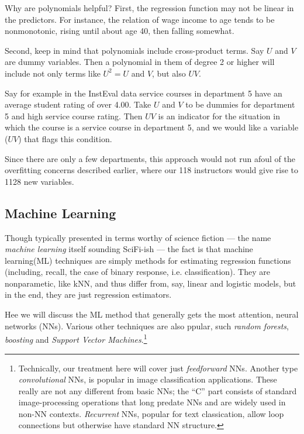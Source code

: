 Why are polynomials helpful?  First, the regression function may not be
linear in the predictors.  For instance, the relation of wage income to
age tends to be nonmonotonic, rising until about age 40, then falling
somewhat.

Second, keep in mind that polynomials include cross-product terms.
Say $U$ and $V$ are dummy variables.  Then a polynomial in them of
degree 2 or higher will include not only terms like $U^2 = U$ and $V$,
but also $UV$.

Say for example in the InstEval data service courses in department 5
have an average student rating of over 4.00.  Take $U$ and $V$ to be
dummies for department 5 and high service course rating.  Then $UV$ is
an indicator for the situation in which the course is a service course
in department 5, and we would like a variable ($UV$) that flags this
condition.

Since there are only a few departments, this approach would not run
afoul of the overfitting concerns described earlier, where our 118
instructors would give rise to 1128 new variables.

\subsection{Machine Learning}

Though typically presented in terms worthy of science fiction --- the
name \textit{machine learning} itself sounding SciFi-ish --- the fact is
that machine learning(ML) techniques are simply methods for estimating
regression functions (including, recall, the case of binary response,
i.e. classification).  They are nonparametic, like kNN, and thus differ
from, say, linear and logistic models, but in the end, they are just
regression estimators.

Hee we will discuss the ML method that generally gets the most
attention, neural networks (NNs).  Various other techniques are also
ppular, such \textit{random forests}, \textit{boosting} and
\textit{Support Vector Machines}.\footnote{Technically, our treatment
here will cover just \textit{feedforward} NNs.  Another type
\textit{convolutional} NNs, is popular in image classification
applications.  These really are not any different from basic NNs; the
``C'' part consists of standard image-processing operations that long
predate NNs and are widely used in non-NN contexts.  \textit{Recurrent}
NNs, popular for text classication, allow loop connections but otherwise
have standard NN structure.}

